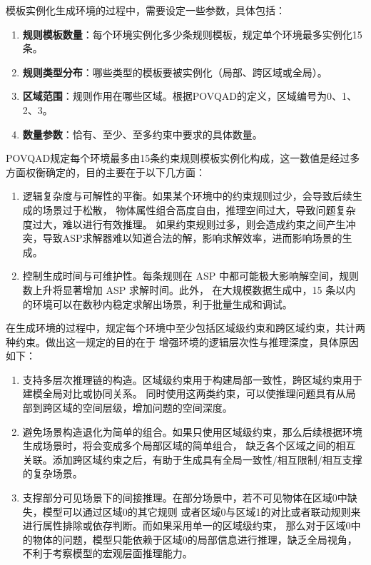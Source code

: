 模板实例化生成环境的过程中，需要设定一些参数，具体包括：
\begin{enumerate}[nosep]
\item \textbf{规则模板数量}：每个环境实例化多少条规则模板，规定单个环境最多实例化15条。
\item \textbf{规则类型分布}：哪些类型的模板要被实例化（局部、跨区域或全局）。
\item \textbf{区域范围}：规则作用在哪些区域。根据POVQAD的定义，区域编号为0、1、2、3。
\item \textbf{数量参数}：恰有、至少、至多约束中要求的具体数量。
\end{enumerate}

POVQAD规定每个环境最多由15条约束规则模板实例化构成，这一数值是经过多方面权衡确定的，目的主要在于以下几方面：
\begin{enumerate}[nosep]
\item 逻辑复杂度与可解性的平衡。如果某个环境中的约束规则过少，会导致后续生成的场景过于松散，
物体属性组合高度自由，推理空间过大，导致问题复杂度过大，难以进行有效推理。
如果约束规则过多，则会造成约束之间产生冲突，导致ASP求解器难以知道合法的解，影响求解效率，进而影响场景的生成。
\item 控制生成时间与可维护性。每条规则在 ASP 中都可能极大影响解空间，规则数上升将显著增加 ASP 求解时间。此外，
在大规模数据生成中，15 条以内的环境可以在数秒内稳定求解出场景，利于批量生成和调试。
\end{enumerate}

在生成环境的过程中，规定每个环境中至少包括区域级约束和跨区域约束，共计两种约束。做出这一规定的目的在于
增强环境的逻辑层次性与推理深度，具体原因如下：
\begin{enumerate}[nosep]
\item 支持多层次推理链的构造。区域级约束用于构建局部一致性，跨区域约束用于建模全局对比或协同关系。
同时使用这两类约束，可以使推理问题具有从局部到跨区域的空间层级，增加问题的空间深度。
\item 避免场景构造退化为简单的组合。如果只使用区域级约束，那么后续根据环境生成场景时，将会变成多个局部区域的简单组合，
缺乏各个区域之间的相互关联。添加跨区域约束之后，有助于生成具有全局一致性/相互限制/相互支撑的复杂场景。
\item 支撑部分可见场景下的间接推理。在部分场景中，若不可见物体在区域0中缺失，模型可以通过区域0的其它规则
或者区域0与区域1的对比或者联动规则来进行属性排除或依存判断。而如果采用单一的区域级约束，
那么对于区域0中的物体的问题，模型只能依赖于区域0的局部信息进行推理，缺乏全局视角，不利于考察模型的宏观层面推理能力。
\end{enumerate}

